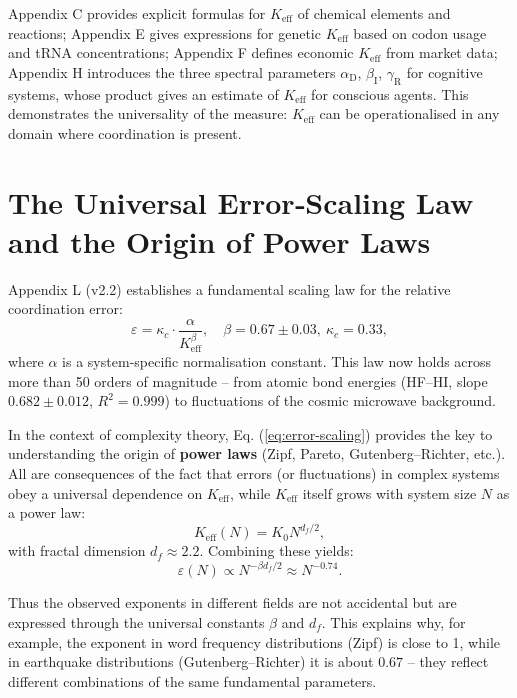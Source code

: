 \documentclass[11pt]{article}
\theoremstyle{remark}
\newcommand{\Keff}{K_{\mathrm{eff}}}
\newcommand{\df}{d_{\!f}}
\newcommand{\alD}{\alpha_{\mathrm{D}}}
\newcommand{\beI}{\beta_{\mathrm{I}}}
\newcommand{\gaR}{\gamma_{\mathrm{R}}}
\begin{document}
	Appendix C provides explicit formulas for $\Keff$ of chemical elements and reactions; Appendix E gives expressions for genetic $\Keff$ based on codon usage and tRNA concentrations; Appendix F defines economic $\Keff$ from market data; Appendix H introduces the three spectral parameters $\alD$, $\beI$, $\gaR$ for cognitive systems, whose product gives an estimate of $\Keff$ for conscious agents. This demonstrates the universality of the measure: $\Keff$ can be operationalised in any domain where coordination is present.
	
	\section{The Universal Error‑Scaling Law and the Origin of Power Laws}
	\label{sec:scaling}
	
	Appendix L (v2.2) establishes a fundamental scaling law for the relative coordination error:
	\begin{equation}
		\varepsilon = \kappa_c \cdot \frac{\alpha}{\Keff^{\beta}}, \quad \beta = 0.67 \pm 0.03,\ \kappa_c = 0.33,
		\label{eq:error-scaling}
	\end{equation}
	where $\alpha$ is a system‑specific normalisation constant. This law now holds across more than 50 orders of magnitude – from atomic bond energies (HF–HI, slope $0.682\pm0.012$, $R^2=0.999$) to fluctuations of the cosmic microwave background.
	
	In the context of complexity theory, Eq. (\ref{eq:error-scaling}) provides the key to understanding the origin of \textbf{power laws} (Zipf, Pareto, Gutenberg–Richter, etc.). All are consequences of the fact that errors (or fluctuations) in complex systems obey a universal dependence on $\Keff$, while $\Keff$ itself grows with system size $N$ as a power law:
	\begin{equation}
		\Keff(N) = K_0 N^{\df/2},
	\end{equation}
	with fractal dimension $\df \approx 2.2$. Combining these yields:
	\begin{equation}
		\varepsilon(N) \propto N^{-\beta \df/2} \approx N^{-0.74}.
	\end{equation}
	
	Thus the observed exponents in different fields are not accidental but are expressed through the universal constants $\beta$ and $\df$. This explains why, for example, the exponent in word frequency distributions (Zipf) is close to 1, while in earthquake distributions (Gutenberg–Richter) it is about $0.67$ – they reflect different combinations of the same fundamental parameters.
	
\end{document}
